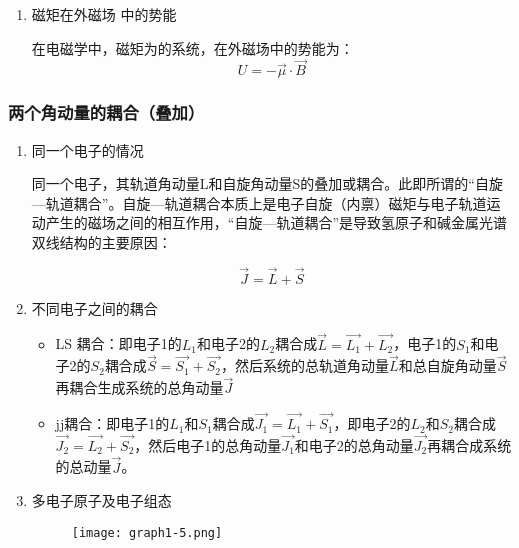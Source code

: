 \documentclass[dvipsnames, svgnames,a4paper,11pt]{article}
\begin{document}
\begin{enumerate}
			\item 磁矩在外磁场 中的势能
					
				在电磁学中，磁矩为的系统，在外磁场中的势能为：
				\[
					U = - \vec{\mu} \cdot \vec{B}
				\]	
				

					
		\end{enumerate}


	\subsubsection{两个角动量的耦合（叠加）}

		\begin{enumerate}
			\item 同一个电子的情况

				同一个电子，其轨道角动量L和自旋角动量S的叠加或耦合。此即所谓的“自旋—轨道耦合”。自旋—轨道耦合本质上是电子自旋（内禀）磁矩与电子轨道运动产生的磁场之间的相互作用，“自旋—轨道耦合”是导致氢原子和碱金属光谱双线结构的主要原因：

					\[
						\vec{J}=\vec{L}+\vec{S}	
					\]

			\item 不同电子之间的耦合

				\begin{itemize}
					\item LS 耦合：即电子1的$L_1$和电子2的$L_2$耦合成$\vec{L}=\vec{L_1}+\vec{L_2}$，电子1的$S_1$和电子2的$S_2$耦合成$\vec{S}=\vec{S_1}+\vec{S_2}$，然后系统的总轨道角动量$\vec{L}$和总自旋角动量$\vec{S}$再耦合生成系统的总角动量$\vec{J}$
					
					\item jj耦合：即电子1的$L_1$和$S_1$耦合成$\vec{J_1}=\vec{L_1}+\vec{S_1}$，即电子2的$L_2$和$S_2$耦合成$\vec{J_2}=\vec{L_2}+\vec{S_2}$，然后电子1的总角动量$\vec{J_1}$和电子2的总角动量$\vec{J_2}$再耦合成系统的总动量$\vec{J}$。
				\end{itemize}

			\item 多电子原子及电子组态
			
				\begin{figure}[H]
					\centering
					\texttt{[image: graph1-5.png]}
					\label{fig:graph1-5}
				\end{figure}
				
				
		\end{enumerate}
\end{document}
